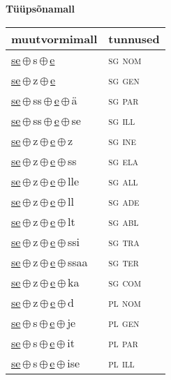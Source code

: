 

\vspace{3.5em}
\noindent \begin{minipage}{\textwidth}
\noindent \textbf{Tüüpsõnamall \,}\\

\begin{sideways}
\begin{tabular}{l l}
muutvormimall & tunnused \\
\hline
\underline{se}\,$\oplus$\,s\,$\oplus$\,\underline{e} & \textsc{ sg nom } \\
\underline{se}\,$\oplus$\,z\,$\oplus$\,\underline{e} & \textsc{ sg gen } \\
\underline{se}\,$\oplus$\,ss\,$\oplus$\,\underline{e}\,$\oplus$\,ä & \textsc{ sg par } \\
\underline{se}\,$\oplus$\,ss\,$\oplus$\,\underline{e}\,$\oplus$\,se & \textsc{ sg ill } \\
\underline{se}\,$\oplus$\,z\,$\oplus$\,\underline{e}\,$\oplus$\,z & \textsc{ sg ine } \\
\underline{se}\,$\oplus$\,z\,$\oplus$\,\underline{e}\,$\oplus$\,ss & \textsc{ sg ela } \\
\underline{se}\,$\oplus$\,z\,$\oplus$\,\underline{e}\,$\oplus$\,lle & \textsc{ sg all } \\
\underline{se}\,$\oplus$\,z\,$\oplus$\,\underline{e}\,$\oplus$\,ll & \textsc{ sg ade } \\
\underline{se}\,$\oplus$\,z\,$\oplus$\,\underline{e}\,$\oplus$\,lt & \textsc{ sg abl } \\
\underline{se}\,$\oplus$\,z\,$\oplus$\,\underline{e}\,$\oplus$\,ssi & \textsc{ sg tra } \\
\underline{se}\,$\oplus$\,z\,$\oplus$\,\underline{e}\,$\oplus$\,ssaa & \textsc{ sg ter } \\
\underline{se}\,$\oplus$\,z\,$\oplus$\,\underline{e}\,$\oplus$\,ka & \textsc{ sg com } \\
\underline{se}\,$\oplus$\,z\,$\oplus$\,\underline{e}\,$\oplus$\,d & \textsc{ pl nom } \\
\underline{se}\,$\oplus$\,s\,$\oplus$\,\underline{e}\,$\oplus$\,je & \textsc{ pl gen } \\
\underline{se}\,$\oplus$\,s\,$\oplus$\,\underline{e}\,$\oplus$\,it & \textsc{ pl par } \\
\underline{se}\,$\oplus$\,s\,$\oplus$\,\underline{e}\,$\oplus$\,ise & \textsc{ pl ill } \\

\end{tabular}
\end{sideways}
\end{minipage}
